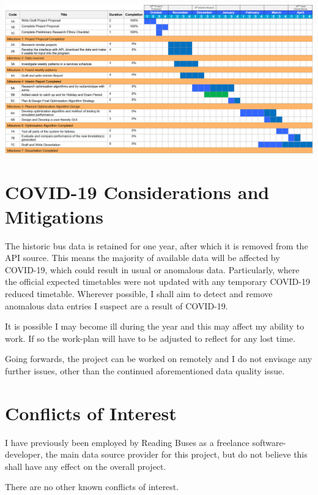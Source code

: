 \documentclass[]{report}
\begin{document}
\graphicspath{ {images/} }
\includegraphics[width=\columnwidth]{ganntChartV2}

\section*{COVID-19 Considerations and Mitigations}
The historic bus data is retained for one year, after which it is removed from the API source. This means the majority of available data will be affected by COVID-19, which could result in usual or anomalous data. Particularly, where the official expected timetables were not updated with any temporary COVID-19 reduced timetable. Wherever possible, I shall aim to detect and remove anomalous data entries I suspect are a result of COVID-19. 

\vspace{0.5cm}
It is possible I may become ill during the year and this may affect my ability to work. If so the work-plan will have to be adjusted to reflect for any lost time. 
  
\vspace{0.5cm}
Going forwards, the project can be worked on remotely and I do not envisage any further issues, other than the continued aforementioned data quality issue.    

\section*{Conflicts of Interest}
I have previously been employed by Reading Buses as a freelance software-developer, the main data source provider for this project, but do not believe this shall have any effect on the overall project.

\vspace{0.5cm}
There are no other known conflicts of interest.



\end{document}
